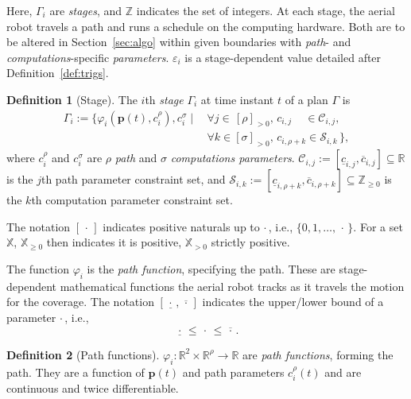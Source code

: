 \documentclass[letterpaper,10pt,journal,twoside]{IEEEtran}
\theoremstyle{definition}
\newtheorem{defn}{Definition}[section]
\begin{document}
Here, $\Gamma_i$ are \emph{stages}, and $\mathbb{Z}$ indicates the set of integers. At each stage, the aerial robot travels a path and runs a schedule on the computing hardware. Both are to be altered in Section~\ref{sec:algo} within given boundaries with \emph{path}- and \emph{computations}-specific \emph{parameters}. $\varepsilon_i$ is a stage-dependent value detailed %
after Definition~\ref{def:trigs}.

\begin{defn}[Stage]\label{def:stage}
  The $i$th \emph{stage} $\Gamma_i$ at time instant $t$ of a plan $\Gamma$ is
  \begin{equation*}\begin{split}
    \Gamma_i:=\{\varphi_i(\mathbf{p}(t),c_i^\rho),c_i^\sigma\mid
    \,&\forall j\in\,[\rho]_{>0},\,c_{i,j}\,\,\,\,\,\,\,\in\mathcal{C}_{i,j},\,\\
      &\forall k\in[\sigma]_{>0},\,c_{i,\rho+k}\in\mathcal{S}_{i,k}\,\},
  \end{split}\end{equation*}
  where $c_i^\rho$ and $c_i^\sigma$ are $\rho$ \emph{path} and $\sigma$ \emph{computations parameters}. $\mathcal{C}_{i,j}:=[\underline{c}_{i,j},\overline{c}_{i,j}]\subseteq\mathbb{R}$ is the $j$th path parameter constraint set, and $\mathcal{S}_{i,k}:=[\underline{c}_{i,\rho+k},\overline{c}_{i,\rho+k}]\subseteq\mathbb{Z}_{\geq 0}$ is the $k$th computation parameter constraint set.
\end{defn}

The notation $[\,\cdot\,]$ indicates positive naturals up to $\cdot$\,, i.e., $\{0,1,\dots,\,\cdot\,\}$.
For a set $\mathbb{X}$, $\mathbb{X}_{\geq 0}$ then indicates it is positive, $\mathbb{X}_{> 0}$ strictly positive.

The function $\varphi_i$ is the \emph{path function}, specifying the path. These are stage-dependent mathematical functions the aerial robot tracks as it travels the motion for the coverage. The notation $[\underline{\,\cdot\,},\overline{\,\cdot\,}]$ indicates the upper/lower bound of a parameter $\cdot\,$, i.e.,
\begin{equation}
  \underline{\,\cdot\,}\leq\,\cdot\,\leq\overline{\,\cdot\,}.
\end{equation}

\begin{defn}[Path functions]
  \label{def:paths}
  $\varphi_i:\mathbb{R}^2\times\mathbb{R}^\rho\rightarrow\mathbb{R}%
  $ are \emph{path functions}, forming the path. They are a function of $\mathbf{p}(t)$ and path parameters $c_i^\rho(t)$ and are continuous and twice differentiable.
\end{defn}
\end{document}
